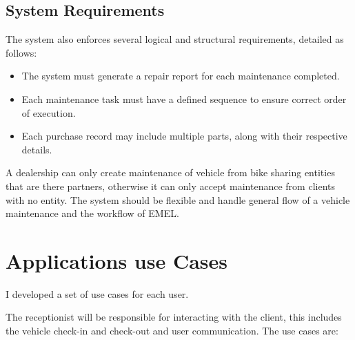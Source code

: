\subsection{System Requirements}
The system also enforces several logical and structural requirements, detailed as follows:
\begin{itemize}
    \item The system must generate a repair report for each maintenance completed.
    \item Each maintenance task must have a defined sequence to ensure correct order of execution.
    \item Each purchase record may include multiple parts, along with their respective details.
\end{itemize}

A dealership can only create maintenance of vehicle from bike sharing entities that are there partners, otherwise it can only accept maintenance from clients with no entity.
The system should be flexible and handle general flow of a vehicle maintenance and the workflow of EMEL.  

\section{Applications use Cases} 
I developed a set of use cases for each user.

The receptionist will be responsible for interacting with the client, this includes the vehicle check-in and check-out and user communication. 
The use cases are:

